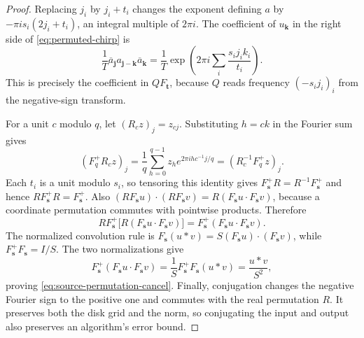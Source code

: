 \begin{proof}
Replacing $j_i$ by $j_i+t_i$ changes the exponent defining $a$ by
$-\pi i s_i(2j_i+t_i)$, an integral multiple of $2\pi i$.
The coefficient of $u_{\boldsymbol k}$ in the right side of
\eqref{eq:permuted-chirp} is
\[
 \frac1T\overline a_{\boldsymbol j}
               a_{\boldsymbol j-\boldsymbol k}
               \overline a_{\boldsymbol k}
 =\frac1T\exp\left(2\pi i\sum_i
                       \frac{s_i j_i k_i}{t_i}\right).
\]
This is precisely the coefficient in $QF_{\boldsymbol t}$, because
$Q$ reads frequency $(-s_i j_i)_i$ from the negative-sign transform.

For a unit $c$ modulo $q$, let $(R_cz)_j=z_{cj}$. Substituting $h=ck$
in the Fourier sum gives
\[
 (F_q^+R_cz)_j
 =\frac1q\sum_{h=0}^{q-1}z_h e^{2\pi i h c^{-1}j/q}
 =(R_c^{-1}F_q^+z)_j.
\]
Each $t_i$ is a unit modulo $s_i$, so tensoring this identity gives
$F_{\boldsymbol s}^+R=R^{-1}F_{\boldsymbol s}^+$ and hence
$RF_{\boldsymbol s}^+R=F_{\boldsymbol s}^+$. Also
$(RF_{\boldsymbol s}u)\mathbin{\cdot}(RF_{\boldsymbol s}v)
=R(F_{\boldsymbol s}u\mathbin{\cdot}F_{\boldsymbol s}v)$,
because a coordinate permutation commutes with pointwise products.
Therefore
\[
 RF_{\boldsymbol s}^+\bigl[R(F_{\boldsymbol s}u\mathbin{\cdot}
                                       F_{\boldsymbol s}v)\bigr]
 =F_{\boldsymbol s}^+(F_{\boldsymbol s}u\mathbin{\cdot}
                                       F_{\boldsymbol s}v).
\]
The normalized convolution rule is
$F_{\boldsymbol s}(u*v)=S(F_{\boldsymbol s}u)\mathbin{\cdot}
(F_{\boldsymbol s}v)$, while
$F_{\boldsymbol s}^+F_{\boldsymbol s}=I/S$. The two normalizations give
\[
 F_{\boldsymbol s}^+
   (F_{\boldsymbol s}u\mathbin{\cdot}F_{\boldsymbol s}v)
 =\frac1S F_{\boldsymbol s}^+F_{\boldsymbol s}(u*v)
 =\frac{u*v}{S^2},
\]
proving \eqref{eq:source-permutation-cancel}. Finally, conjugation
changes the negative Fourier sign to the positive one and commutes with
the real permutation $R$. It preserves both the disk grid and the norm,
so conjugating the input and output also preserves an algorithm's error
bound.
\end{proof}
